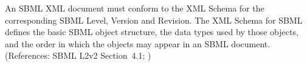 An SBML XML document must conform to the XML Schema for the corresponding
SBML Level, Version and Revision.  The XML Schema for SBML defines the basic
SBML object structure, the data types used by those objects, and the order
in which the objects may appear in an SBML document.  (References: SBML
L2v2 Section~4.1; )
